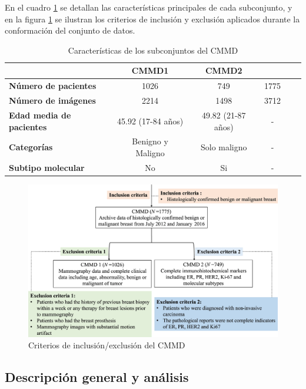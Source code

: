 \documentclass[a4paper,10pt]{book}
\begin{document}
En el cuadro \ref{tab:cmmd_features} se detallan las características principales de cada subconjunto, y en la figura \ref{fig:cmmd_criteria} se ilustran los criterios de inclusión y exclusión aplicados durante la conformación del conjunto de datos.


\begin{table}
    \centering
    \begin{tabular}{lccccc}
        \toprule
        & \textbf{CMMD1} & \textbf{CMMD2} & \\
        \midrule
        \textbf{Número de pacientes} & 1026 & 749 & 1775\\
        \textbf{Número de imágenes} & 2214 & 1498 & 3712\\
        \textbf{Edad media de pacientes} & 45.92 (17-84 años) & 49.82 (21-87 años) & - \\
        \textbf{Categorías} & Benigno y Maligno & Solo maligno & - \\
        \textbf{Subtipo molecular} & No & Si & - \\
        \bottomrule
    \end{tabular}
    \caption{Características de los subconjuntos del CMMD}
    \label{tab:cmmd_features}
\end{table}


\begin{figure}
	\centering
	\includegraphics[width=0.8\linewidth]{reports//assets/cmmd_criteria.png}
	\caption{Criterios de inclusión/exclusión del CMMD \cite{cai_online_2023}}
	\label{fig:cmmd_criteria}
\end{figure}




\subsection{Descripción general y análisis}
\end{document}
